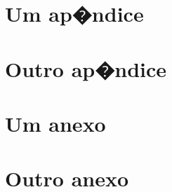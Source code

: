 \documentclass[phd]{ppgccufmg}    %
\begin{document}


\begin{appendices}

\chapter{Um ap�ndice}

\dummytxta
\dummytxtb
\dummytxtc
\dummytxta
\dummytxtb

\chapter{Outro ap�ndice}

\dummytxta
\dummytxtb
\dummytxtc
\dummytxta
\dummytxtb

\end{appendices}


\begin{attachments}

\chapter{Um anexo}

\dummytxta
\dummytxtb
\dummytxtc
\dummytxta
\dummytxtb

\chapter{Outro anexo}

\dummytxta
\dummytxtb

\end{attachments}
\end{document}
